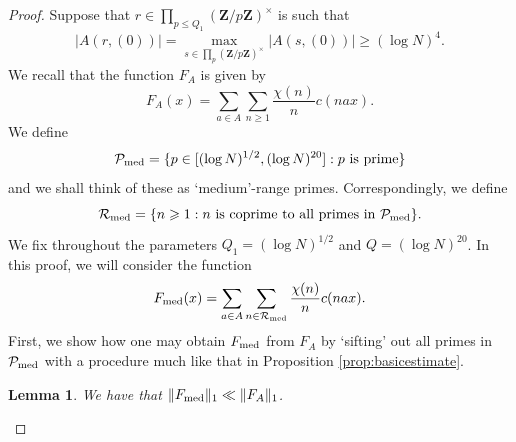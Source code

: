 \documentclass[11pt, reqno]{amsart}
\newtheorem{lemma}[theorem]{Lemma}
\begin{document}
\begin{proof}
    Suppose that $r\in\prod_{p\leqslant Q_1}(\mathbf{Z}/p\mathbf{Z})^\times$ is such that $$|A(r,(0))|=\max_{s\in \prod_p(\mathbf{Z}/p\mathbf{Z})^\times}|A(s,(0))|\geqslant (\log N)^4.$$ We recall that the function $F_A$ is given by
    $$F_A(x)=\sum_{a\in A}\sum_{n\geqslant 1}\frac{\chi(n)}{n}c( nax).$$
 We define
    \begin{equation*}
        \mathcal{P}_\textnormal{med}=\{p\in[(\log N)^{1/2},(\log N)^{20}]: p\text{ is prime}\}
    \end{equation*} and we shall think of these as `medium'-range primes. Correspondingly, we define
    \begin{equation*}
        \mathcal{R}_\textnormal{med}=\{n\geqslant 1:n\text{ is coprime to all primes in }\mathcal{P}_\textnormal{med}\}.
    \end{equation*} We fix throughout the parameters $Q_1=(\log N)^{1/2}$ and $Q=(\log N)^{20}$. In this proof, we will consider the function $$F_\textnormal{med}(x)=\sum_{a\in A}\sum_{n \in \mathcal{R}_\textnormal{med}}\frac{\chi(n)}{n}c( nax).$$ First, we show how one may obtain $F_\textnormal{med}$ from $F_A$ by `sifting' out all primes in $\mathcal{P}_\textnormal{med}$ with a procedure much like that in Proposition \ref{prop:basicestimate}.
    \begin{lemma}\label{lem:F_mmodel}
        We have that $\lVert F_\textnormal{med}\rVert_1\ll \lVert F_A\rVert_1$.
        

\end{lemma}
\end{proof}
\end{document}
